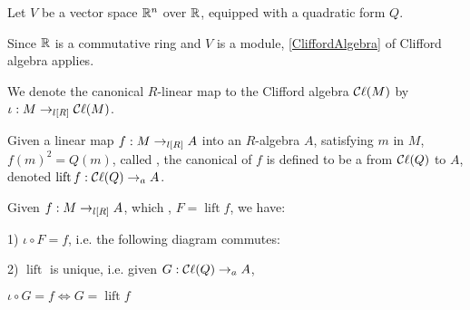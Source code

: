 \begin{example}
  \label{ex:clifford_algebra_v}

  Let $V$ be a vector space $\mathbb R^n$ over $\mathbb R$, equipped with a quadratic form $Q$.
  
  Since $\mathbb R$ is a commutative ring and $V$ is a module, \cref{CliffordAlgebra} of Clifford algebra applies.
\end{example}

\begin{definition}
  \label{iota}
  \leanok

  We denote the canonical $R$-linear map to the Clifford algebra $\mathop{\mathcal{C}\ell}(M)$ by $\iota : M \to_{l[R]} \mathop{\mathcal{C}\ell}(M)$.

\end{definition}

\begin{definition}
  \label{lift}
  \leanok

  Given a linear map $f : M \to_{l[R]} A$ into an $R$-algebra $A$, satisfying \forall $m$ in $M$, $f(m)^2 = Q(m)$,
  called ,
  the canonical  of $f$ is defined to be a  from $\mathop{\mathcal{C}\ell}(Q)$ to $A$,
  denoted $\operatorname{lift} f : \mathop{\mathcal{C}\ell}(Q) \to_{a} A$.

\end{definition}

\begin{theorem}
  \label{univ}
  \leanok

  Given $f : M \to_{l[R]} A$, which , $F = \operatorname{lift} f$, we have:

  1) $\iota \circ F = f$, i.e. the following diagram commutes:

  \begin{figure}[H]
    \centering
  \end{figure}

  2) $\operatorname{lift}$ is unique, i.e. given $G : \mathop{\mathcal{C}\ell}(Q) \to_{a} A$, 

  $\iota \circ G = f \iff G = \operatorname{lift} f$

\end{theorem}

